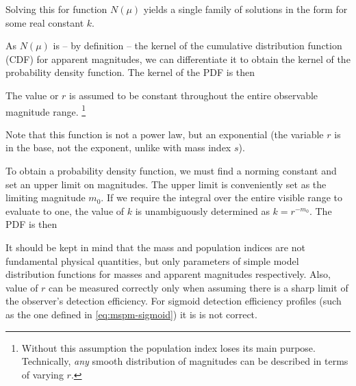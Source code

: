             Solving this for function $N(\mu)$ yields a single family of solutions
            in the form
            for some real constant $k$.

            As $N(\mu)$ is -- by definition -- the kernel of the
            cumulative distribution function (CDF) for apparent magnitudes, we can differentiate it
            to obtain the kernel of the probability density function. The kernel of the PDF is then

            The value or $r$ is assumed to be constant throughout the entire observable magnitude range.%
            \footnote{Without this assumption the population index loses its main purpose.
            Technically, \emph{any} smooth distribution of magnitudes can be described in terms of varying $r$.}

            Note that this function is not a power law, but an exponential (the variable $r$
            is in the base, not the exponent, unlike with mass index $s$).

            To obtain a probability density function, we must find a norming constant
            and set an upper limit on magnitudes. The upper limit is conveniently set as the limiting
            magnitude $m_0$. If we require the integral over the entire visible range to evaluate to one,
            the value of $k$ is unambiguously determined as $k = r^{-m_0}$.
            The PDF is then

            It should be kept in mind that the mass and population indices are not fundamental physical quantities,
            but only parameters of simple model distribution functions for masses and apparent magnitudes respectively.
            Also, value of $r$ can be measured correctly only when assuming there is a sharp limit of the observer's detection efficiency.
            For sigmoid detection efficiency profiles (such as the one defined in \cref{eq:mspm-sigmoid}) it
            is is not correct.



